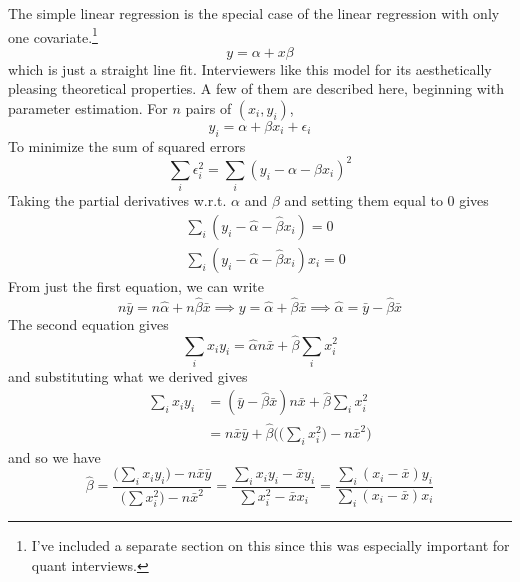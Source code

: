 \documentclass{article}
\begin{document}
    The simple linear regression is the special case of the linear regression with only one covariate.\footnote{I've included a separate section on this since this was especially important for quant interviews.}
    \begin{equation}
      y = \alpha + x \beta
    \end{equation}
    which is just a straight line fit. Interviewers like this model for its aesthetically pleasing theoretical properties. A few of them are described here, beginning with parameter estimation. For $n$ pairs of $(x_i, y_i)$, 
    \begin{equation}
      y_i = \alpha + \beta x_i + \epsilon_i
    \end{equation}
    To minimize the sum of squared errors 
    \begin{equation}
      \sum_{i} \epsilon_i^2 = \sum_{i} (y_i - \alpha - \beta x_i)^2
    \end{equation}
    Taking the partial derivatives w.r.t. $\alpha$ and $\beta$ and setting them equal to $0$ gives 
    \begin{align*}
      &\sum_i (y_i - \hat{\alpha} - \hat{\beta} x_i) = 0 \\
      &\sum_i (y_i - \hat{\alpha} - \hat{\beta} x_i) x_i = 0
    \end{align*}
    From just the first equation, we can write 
    \begin{equation}
      n \bar{y} = n \hat{\alpha} + n \hat{\beta} \bar{x} \implies y = \hat{\alpha} + \hat{\beta} \bar{x} \implies \hat{\alpha}  = \bar{y} - \hat{\beta} \bar{x} 
    \end{equation}
    The second equation gives 
    \begin{equation}
      \sum_{i} x_i y_i = \hat{\alpha} n \bar{x} + \hat{\beta} \sum_{i} x_i^2
    \end{equation}
    and substituting what we derived gives 
    \begin{align*}
      \sum_{i} x_i y_i & = (\bar{y} - \hat{\beta} \bar{x}) n \bar{x} + \hat{\beta} \sum_i x_i^2 \\
      & = n \bar{x} \bar{y} + \hat{\beta} \bigg( \Big(\sum_i x_i^2 \Big) - n \bar{x}^2 \bigg)
    \end{align*}
    and so we have 
    \begin{equation}
      \hat{\beta} = \frac{ \big( \sum_i x_i y_i \big) - n \bar{x}\bar{y}}{\big( \sum x_i^2 \big) - n \bar{x}^2} = \frac{ \sum_i x_i y_i - \bar{x} y_i}{\sum x_i^2 - \bar{x} x_i} = \frac{ \sum_i (x_i - \bar{x}) y_i}{\sum_i (x_i - \bar{x}) x_i}
    \end{equation}
\end{document}
